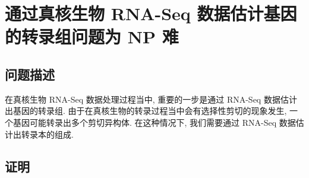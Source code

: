 \chapter{通过真核生物 RNA-Seq 数据估计基因的转录组问题为 NP 难}
\label{chap-rna-seq-nphard}

\section{问题描述}
在真核生物 RNA-Seq 数据处理过程当中, 重要的一步是通过 RNA-Seq 数据估计出基因的转录组. 
由于在真核生物的转录过程当中会有选择性剪切的现象发生, 一个基因可能转录出多个剪切异构体. 
在这种情况下, 我们需要通过 RNA-Seq 数据估计出转录本的组成. 

\section{证明}

